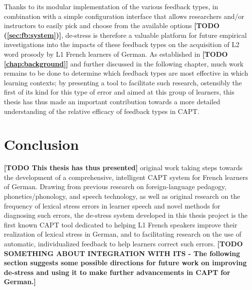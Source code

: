 \documentclass[11pt,a4paper,onecolumn]{article}
\newcommand{\TODO}[1]{{\color{red}\textbf{[TODO #1]}}}
\begin{document}
Thanks to its modular implementation of the various feedback types, in combination with a simple configuration interface that allows researchers and/or instructors to easily pick and choose from the available options \TODO{(\cref{sec:fb:system})}, de-stress is therefore a valuable platform for future empirical investigations into the impacts of these feedback types on the 
acquisition of L2 word prosody 
by L1 French learners of German. As established in \TODO{\cref{chap:background}} and further discussed in the following chapter, much work remains to be done to determine which feedback types are most effective in which learning contexts; by presenting a tool to facilitate such research, ostensibly the first of its kind for this type of error and aimed at this group of learners, this thesis has thus made an important contribution towards a more detailed understanding of the relative efficacy of feedback types in CAPT.


\section{Conclusion}

\TODO{This thesis has thus presented} original work taking steps towards the development of a comprehensive, intelligent CAPT system for French learners of German. Drawing from previous research on foreign-language pedagogy, phonetics/phonology, and speech technology, as well as original research on the frequency of lexical stress errors in learner speech and novel methods for diagnosing such errors, the de-stress system developed in this thesis project is the first known CAPT tool dedicated to helping L1 French speakers improve their realization of lexical stress in German, and to facilitating research on the use of automatic, individualized feedback to help learners correct such errors. 
\TODO{SOMETHING ABOUT INTEGRATION WITH ITS - The following section suggests some possible directions for future work on improving de-stress and using it to make further advancements in CAPT for German.}



\clearpage
\printbibliography[title={References}]
\end{document}
